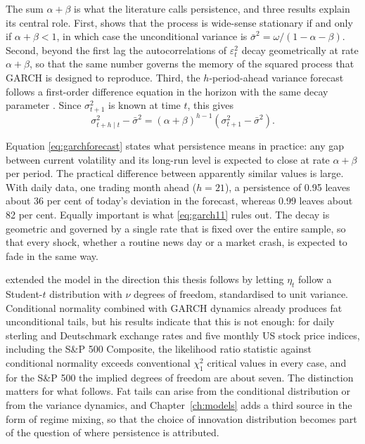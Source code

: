 The sum $\alpha + \beta$ is what the literature calls persistence, and three results explain its central role. First, \textcite{bollerslev1986} shows that the process is wide-sense stationary if and only if $\alpha + \beta < 1$, in which case the unconditional variance is $\bar\sigma^2 = \omega / (1 - \alpha - \beta)$. Second, beyond the first lag the autocorrelations of $\varepsilon_t^2$ decay geometrically at rate $\alpha + \beta$, so that the same number governs the memory of the squared process that GARCH is designed to reproduce. Third, the $h$-period-ahead variance forecast follows a first-order difference equation in the horizon with the same decay parameter \parencite{hamiltonsusmel1994}. Since $\sigma_{t+1}^2$ is known at time $t$, this gives
\begin{equation}\label{eq:garchforecast}
  \sigma^2_{t+h \mid t} - \bar\sigma^2
  = (\alpha + \beta)^{h-1} \left( \sigma^2_{t+1} - \bar\sigma^2 \right).
\end{equation}

Equation \eqref{eq:garchforecast} states what persistence means in practice: any gap between current volatility and its long-run level is expected to close at rate $\alpha + \beta$ per period. The practical difference between apparently similar values is large. With daily data, one trading month ahead ($h = 21$), a persistence of 0.95 leaves about 36 per cent of today's deviation in the forecast, whereas 0.99 leaves about 82 per cent. Equally important is what \eqref{eq:garch11} rules out. The decay is geometric and governed by a single rate that is fixed over the entire sample, so that every shock, whether a routine news day or a market crash, is expected to fade in the same way.

\textcite{bollerslev1987} extended the model in the direction this thesis follows by letting $\eta_t$ follow a Student-$t$ distribution with $\nu$ degrees of freedom, standardised to unit variance. Conditional normality combined with GARCH dynamics already produces fat unconditional tails, but his results indicate that this is not enough: for daily sterling and Deutschmark exchange rates and five monthly US stock price indices, including the S\&P 500 Composite, the likelihood ratio statistic against conditional normality exceeds conventional $\chi^2_1$ critical values in every case, and for the S\&P 500 the implied degrees of freedom are about seven. The distinction matters for what follows. Fat tails can arise from the conditional distribution or from the variance dynamics, and Chapter~\ref{ch:models} adds a third source in the form of regime mixing, so that the choice of innovation distribution becomes part of the question of where persistence is attributed.

